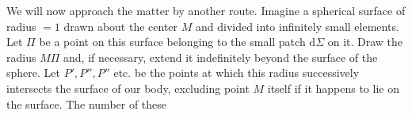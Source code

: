 \par
We will now approach the matter by another route. Imagine a spherical surface of radius $=1$ drawn about the center $M$ and divided into infinitely small elements. Let $\Pi$ be a point on this surface belonging to the small patch $\mathrm{d}\Sigma$ on it. Draw the radius $M\Pi$ and, if necessary, extend it indefinitely beyond the surface of the sphere. Let $P',P'',P''$ etc. be the points at which this radius successively intersects the surface of our body, excluding point $M$ itself if it happens to lie on the surface. The number of these
